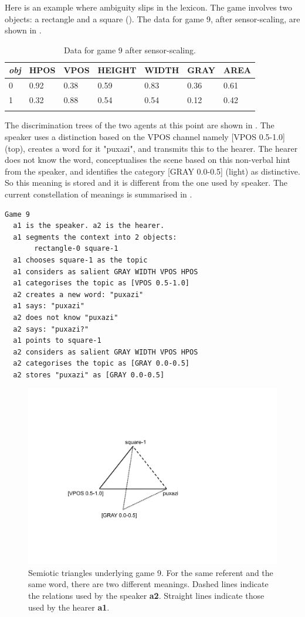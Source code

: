 Here is an example where ambiguity slips in 
the lexicon. The game involves two 
objects: a rectangle and a square (). 
The data for game 9, after sensor-scaling, are
shown in .  
\begin{table}
\begin{center}
\begin{tabular}{ l  l  l  l  l  l  l }
\lsptoprule
{\it obj} & HPOS & VPOS & HEIGHT & WIDTH & GRAY & AREA \\ \midrule
0 & 0.92 & 0.38 & 0.59 & 0.83 & 0.36 & 0.61\\ \midrule
1 & 0.32 & 0.88 & 0.54 & 0.54 & 0.12 & 0.42\\ \midrule
\lspbottomrule
\end{tabular}
\caption{\label{tab:different} Data for game 9 after sensor-scaling.}
\end{center}
\end{table}
The discrimination trees of the two agents at this point
are shown in . 
The speaker uses a distinction based on the 
VPOS channel namely [VPOS 0.5-1.0] (top), creates
a word for it "puxazi", and transmits this to the hearer. 
The hearer does not know the word,
conceptualises the scene based on this non-verbal
hint from the speaker, and identifies the category
[GRAY 0.0-0.5] (light) as distinctive. So this 
meaning is stored and it is different from the one used by 
speaker. The current constellation of meanings
is summarised in . 
\begin{verbatim}
Game 9
  a1 is the speaker. a2 is the hearer. 
  a1 segments the context into 2 objects: 
       rectangle-0 square-1 
  a1 chooses square-1 as the topic 
  a1 considers as salient GRAY WIDTH VPOS HPOS 
  a1 categorises the topic as [VPOS 0.5-1.0]
  a2 creates a new word: "puxazi"
  a1 says: "puxazi"
  a2 does not know "puxazi"
  a2 says: "puxazi?"
  a1 points to square-1
  a2 considers as salient GRAY WIDTH VPOS HPOS 
  a2 categorises the topic as [GRAY 0.0-0.5]
  a2 stores "puxazi" as [GRAY 0.0-0.5]
\end{verbatim}
\begin{figure}[htbp]
  \centerline{\includegraphics[width=.45\textwidth]{chap6/figs/triangle4}}
\caption{\label{triangle4} Semiotic triangles
underlying game 9. For the same referent and the same word, 
there are two different meanings. Dashed lines indicate
the relations used by the speaker {\bf a2}. Straight lines
indicate those used by the hearer {\bf a1}.}
\end{figure}

